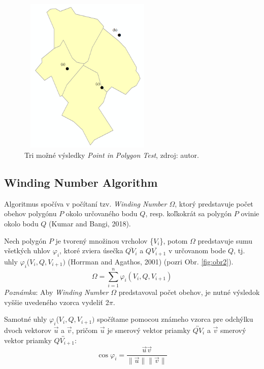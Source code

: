 \documentclass[11pt]{article}
\begin{document}
\begin{figure}[h]
    \includegraphics[width=6.56cm, height=7.5cm]{obr1.png}
    \centering
    \caption{Tri možné výsledky \textit{Point in Polygon Test}, zdroj: autor.}
    \label{fig:obr1}
\end{figure}

\subsection{Winding Number Algorithm}\label{wn}
Algoritmus spočíva v počítaní tzv. \textit{Winding Number $\varOmega$}, ktorý predstavuje počet obehov
polygónu $P$ okolo určovaného bodu $Q$, resp. koľkokrát sa polygón $P$ ovinie okolo bodu $Q$ (Kumar and Bangi, 2018).

Nech polygón $P$ je tvorený množinou vrcholov \{$V_i$\}, potom $\varOmega$ predstavuje sumu všetkých uhlov $\varphi_i$, ktoré zviera úsečka $\overline{Q V_i}$ a $\overline{Q V_{i+1}}$ v určovanom bode $Q$, tj. uhly $\varphi_i$($V_i, Q, V_{i+1})$ (Horrman and Agathos, 2001) (pozri Obr. \ref{fig:obr2}).
\begin{equation*}
\varOmega=\sum_{i=1}^{n} \varphi_i(V_i, Q, V_{i+1})
\end{equation*}
\textit{Poznámka}: Aby \textit{Winding Number $\varOmega$} predstavoval počet obehov, je nutné výsledok vyššie uvedeného vzorca vydeliť 2$\pi$.

Samotné uhly $\varphi_i$($V_i, Q, V_{i+1})$ spočítame pomocou známeho vzorca pre odchýlku dvoch vektorov $\vec{u}$ a $\vec{v}$, pričom $\vec{u}$ je smerový vektor priamky $\overleftrightarrow{QV_i}$ a $\vec{v}$ smerový vektor priamky $\overleftrightarrow{QV_{i+1}}$:
\begin{equation*}
\cos\varphi_i=\frac{\vec{u}\vec{v}}{\lVert\vec{u}\rVert\lVert\vec{v}\rVert}
\end{equation*}
\end{document}
